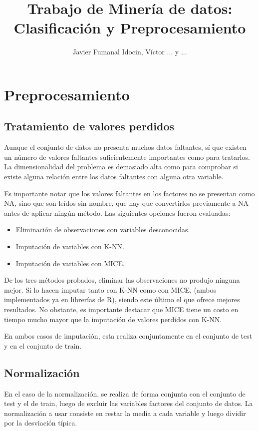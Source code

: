\documentclass[]{scrartcl}
\title{Trabajo de Minería de datos: Clasificación y Preprocesamiento}
\author{Javier Fumanal Idocin, Víctor ... y ...}
\begin{document}
\maketitle

\section{Preprocesamiento}

\subsection{Tratamiento de valores perdidos}

Aunque el conjunto de datos no presenta muchos datos faltantes, sí que existen un número de valores faltantes suficientemente importantes como para tratarlos. La dimensionalidad del problema es demasiado alta como para comprobar si existe alguna relación entre los datos faltantes con alguna otra variable.


Es importante notar que los valores faltantes en los factores no se presentan como NA, sino que son leídos sin nombre, que hay que convertirlos previamente a NA antes de aplicar ningún método. Las siguientes opciones fueron evaluadas:

\begin{itemize}
	\item Eliminación de observaciones con variables desconocidas.
	\item Imputación de variables con K-NN.
	\item Imputación de variables con MICE.
\end{itemize}

De los tres métodos probados, eliminar las observaciones no produjo ninguna mejor. Sí lo hacen imputar tanto con K-NN como con MICE, (ambos implementados ya en librerías de R), siendo este último el que ofrece mejores resultados. No obstante, es importante destacar que MICE tiene un costo en tiempo mucho mayor que la imputación de valores perdidos con K-NN.

En ambos casos de imputación, esta realiza conjuntamente en el conjunto de test y en el conjunto de train.

\subsection{Normalización}

En el caso de la normalización, se realiza de forma conjunta con el conjunto de test y el de train, luego de excluir las variables factores del conjunto de datos. La normalización a usar consiste en restar la media a cada variable y luego dividir por la desviación típica.
\end{document}
